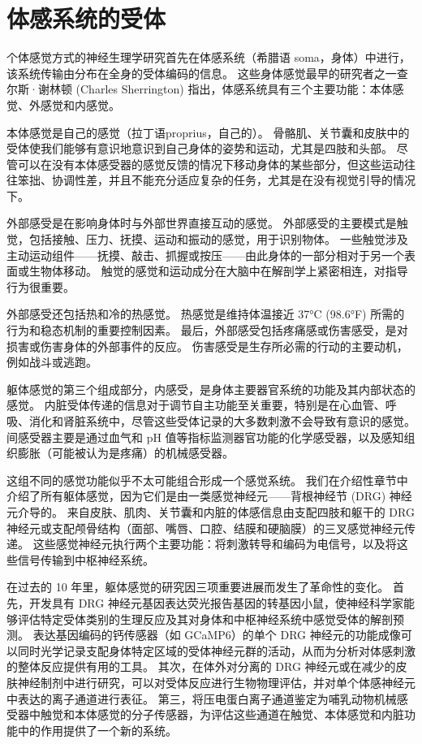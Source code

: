 \chapter{体感系统的受体} \label{chap:chap18}
个体感觉方式的神经生理学研究首先在体感系统（希腊语 soma，身体）中进行，该系统传输由分布在全身的受体编码的信息。 
这些身体感觉最早的研究者之一查尔斯·谢林顿 (Charles Sherrington) 指出，体感系统具有三个主要功能：本体感觉、外感觉和内感觉。


本体感觉是自己的感觉（拉丁语proprius，自己的）。 
骨骼肌、关节囊和皮肤中的受体使我们能够有意识地意识到自己身体的姿势和运动，尤其是四肢和头部。 
尽管可以在没有本体感受器的感觉反馈的情况下移动身体的某些部分，但这些运动往往笨拙、协调性差，并且不能充分适应复杂的任务，尤其是在没有视觉引导的情况下。


外部感受是在影响身体时与外部世界直接互动的感觉。 
外部感受的主要模式是触觉，包括接触、压力、抚摸、运动和振动的感觉，用于识别物体。 
一些触觉涉及主动运动组件——抚摸、敲击、抓握或按压——由此身体的一部分相对于另一个表面或生物体移动。 
触觉的感觉和运动成分在大脑中在解剖学上紧密相连，对指导行为很重要。


外部感受还包括热和冷的热感觉。 
热感觉是维持体温接近 37°C (98.6°F) 所需的行为和稳态机制的重要控制因素。 
最后，外部感受包括疼痛感或伤害感受，是对损害或伤害身体的外部事件的反应。 
伤害感受是生存所必需的行动的主要动机，例如战斗或逃跑。


躯体感觉的第三个组成部分，内感受，是身体主要器官系统的功能及其内部状态的感觉。 
内脏受体传递的信息对于调节自主功能至关重要，特别是在心血管、呼吸、消化和肾脏系统中，尽管这些受体记录的大多数刺激不会导致有意识的感觉。 
间感受器主要是通过血气和 pH 值等指标监测器官功能的化学感受器，以及感知组织膨胀（可能被认为是疼痛）的机械感受器。


这组不同的感觉功能似乎不太可能组合形成一个感觉系统。 
我们在介绍性章节中介绍了所有躯体感觉，因为它们是由一类感觉神经元——背根神经节 (DRG) 神经元介导的。 
来自皮肤、肌肉、关节囊和内脏的体感信息由支配四肢和躯干的 DRG 神经元或支配颅骨结构（面部、嘴唇、口腔、结膜和硬脑膜）的三叉感觉神经元传递。 
这些感觉神经元执行两个主要功能：将刺激转导和编码为电信号，以及将这些信号传输到中枢神经系统。


在过去的 10 年里，躯体感觉的研究因三项重要进展而发生了革命性的变化。 
首先，开发具有 DRG 神经元基因表达荧光报告基因的转基因小鼠，使神经科学家能够评估特定受体类别的生理反应及其对身体和中枢神经系统中感觉受体的解剖预测。 
表达基因编码的钙传感器（如 GCaMP6）的单个 DRG 神经元的功能成像可以同时光学记录支配身体特定区域的受体神经元群的活动，从而为分析对体感刺激的整体反应提供有用的工具。 
其次，在体外对分离的 DRG 神经元或在减少的皮肤神经制剂中进行研究，可以对受体反应进行生物物理评估，并对单个体感神经元中表达的离子通道进行表征。 
第三，将压电蛋白离子通道鉴定为哺乳动物机械感受器中触觉和本体感觉的分子传感器，为评估这些通道在触觉、本体感觉和内脏功能中的作用提供了一个新的系统。



